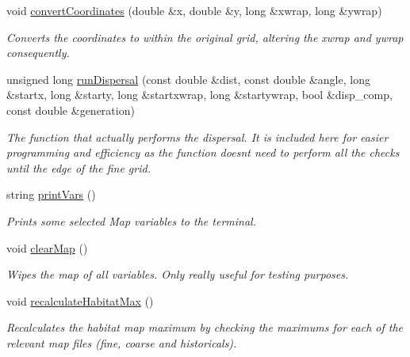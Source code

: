 \begin{DoxyCompactItemize}
void \hyperlink{class_landscape_af5ba56f29b355c5dd7226231144d147e}{convert\+Coordinates} (double \&x, double \&y, long \&xwrap, long \&ywrap)
\begin{DoxyCompactList}\small\item\em Converts the coordinates to within the original grid, altering the xwrap and ywrap consequently. \end{DoxyCompactList}\item 
unsigned long \hyperlink{class_landscape_aedc33de89997456d53cceb3e4e424e64}{run\+Dispersal} (const double \&dist, const double \&angle, long \&startx, long \&starty, long \&startxwrap, long \&startywrap, bool \&disp\+\_\+comp, const double \&generation)
\begin{DoxyCompactList}\small\item\em The function that actually performs the dispersal. It is included here for easier programming and efficiency as the function doesn\textquotesingle{}t need to perform all the checks until the edge of the fine grid. \end{DoxyCompactList}\item 
string \hyperlink{class_landscape_a9b867a59c88f754bae6788451845b698}{print\+Vars} ()
\begin{DoxyCompactList}\small\item\em Prints some selected Map variables to the terminal. \end{DoxyCompactList}\item 
void \hyperlink{class_landscape_a28d01a593cbaf9d8fde9c2e1da996f91}{clear\+Map} ()\hypertarget{class_landscape_a28d01a593cbaf9d8fde9c2e1da996f91}{}\label{class_landscape_a28d01a593cbaf9d8fde9c2e1da996f91}

\begin{DoxyCompactList}\small\item\em Wipes the map of all variables. Only really useful for testing purposes. \end{DoxyCompactList}\item 
void \hyperlink{class_landscape_abaf14ac4da88cd26f6593bdaa88d999f}{recalculate\+Habitat\+Max} ()\hypertarget{class_landscape_abaf14ac4da88cd26f6593bdaa88d999f}{}\label{class_landscape_abaf14ac4da88cd26f6593bdaa88d999f}

\begin{DoxyCompactList}\small\item\em Recalculates the habitat map maximum by checking the maximums for each of the relevant map files (fine, coarse and historicals). \end{DoxyCompactList}\end{DoxyCompactItemize}
